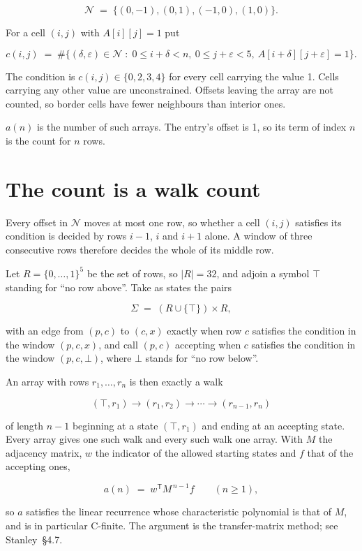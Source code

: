 \documentclass[11pt]{article}
\theoremstyle{definition}
\begin{document}
\[\mathcal{N} \;=\; \{(0,-1), (0,1), (-1,0), (1,0)\}.\]

For a cell $(i,j)$ with $A[i][j] = 1$ put

\[c(i,j) \;=\; \#\bigl\{(\delta,\varepsilon)\in\mathcal{N} \;:\; 0\le i+\delta<n,\ 0\le j+\varepsilon<5,\ A[i+\delta][j+\varepsilon] = 1\bigr\}.\]

The condition is $c(i,j) \in \{0, 2, 3, 4\}$ for every cell carrying the value 1. Cells carrying any other value are unconstrained. Offsets leaving the array are not counted, so border cells have fewer neighbours than interior ones.

$a(n)$ is the number of such arrays. The entry's offset is 1, so its term of index $n$ is the count for $n$ rows.

\section{The count is a walk count}

Every offset in $\mathcal{N}$ moves at most one row, so whether a cell $(i,j)$ satisfies its condition is decided by rows $i-1$, $i$ and $i+1$ alone. A window of three consecutive rows therefore decides the whole of its middle row.

Let $R = \{0,\dots,1\}^{5}$ be the set of rows, so $|R| = 32$, and adjoin a symbol $\top$ standing for ``no row above''. Take as states the pairs

\[\Sigma \;=\; (R \cup \{\top\}) \times R,\]

with an edge from $(p,c)$ to $(c,x)$ exactly when row $c$ satisfies the condition in the window $(p,c,x)$, and call $(p,c)$ accepting when $c$ satisfies the condition in the window $(p,c,\bot)$, where $\bot$ stands for ``no row below''.

An array with rows $r_1,\dots,r_n$ is then exactly a walk

\[(\top,r_1) \to (r_1,r_2) \to \cdots \to (r_{n-1},r_n)\]

of length $n-1$ beginning at a state $(\top,r_1)$ and ending at an accepting state. Every array gives one such walk and every such walk one array. With $M$ the adjacency matrix, $w$ the indicator of the allowed starting states and $f$ that of the accepting ones,

\[a(n) \;=\; w^{\mathsf T} M^{\,n-1} f \qquad (n \ge 1),\]

so $a$ satisfies the linear recurrence whose characteristic polynomial is that of $M$, and is in particular C-finite. The argument is the transfer-matrix method; see Stanley~\S4.7.
\end{document}
